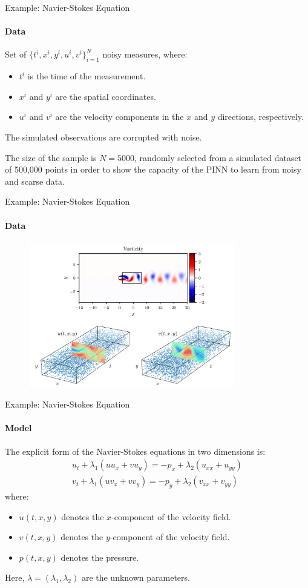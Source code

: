 \begin{frame}{Example: Navier-Stokes Equation}
\framesubtitle{Data}
Set of $\{t^i, x^i, y^i, u^i, v^i\}_{i=1}^N$ noisy measures, where:
\begin{itemize}
    \item \( t^i \) is the time of the measurement.
    \item \( x^i \) and \( y^i \) are the spatial coordinates.
    \item \( u^i \) and \( v^i \) are the velocity components in the \( x \) and \( y \) directions, respectively.
\end{itemize}

The simulated observations are corrupted with noise. 


The size of the sample is \( N = 5000\), randomly selected from a simulated dataset of  500,000 points in order to show the capacity of the PINN to learn from noisy and scarse data.
\end{frame}

\begin{frame}{Example: Navier-Stokes Equation}
\framesubtitle{Data}
\begin{figure}[H]
    \centering
    \includegraphics[width=0.8\textwidth]{img/navier-data.png}
\end{figure}
\end{frame}

\begin{frame}{Example: Navier-Stokes Equation}
\framesubtitle{Model}
The explicit form of the Navier-Stokes equations in two dimensions is:
\begin{align}
    u_t + \lambda_1(uu_x + vu_y) = -p_x + \lambda_2(u_{xx} + u_{yy})\\
    v_t + \lambda_1(uv_x + vv_y) = -p_y + \lambda_2(v_{xx} + v_{yy})
\end{align}
where:
\begin{itemize}
    \item $u(t, x, y)$ denotes the $x$-component of the velocity field.
    \item $v(t, x, y)$ denotes the $y$-component of the velocity field.
    \item $p(t, x, y)$ denotes the pressure.
\end{itemize}
Here, $\lambda = (\lambda_1, \lambda_2)$ are the unknown parameters.
\end{frame}

